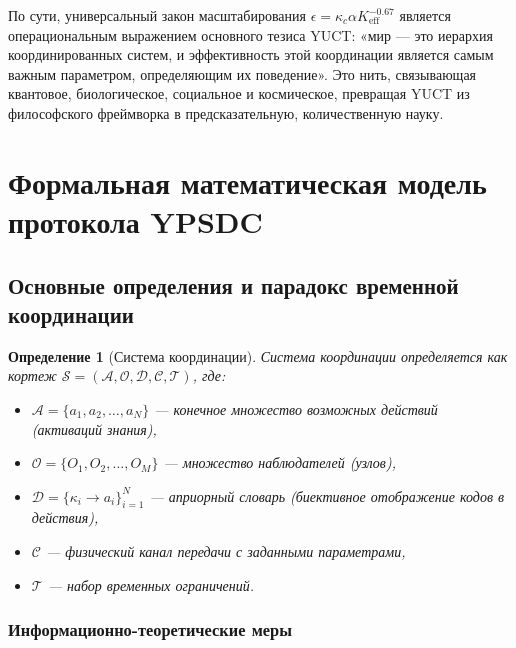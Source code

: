 \documentclass[11pt,a4paper]{article}
\newtheorem{definition}{Определение}
\begin{document}
	По сути, универсальный закон масштабирования \(\epsilon = \kappa_c \alpha K_{\mathrm{eff}}^{-0.67}\) является операциональным выражением основного тезиса YUCT: «мир — это иерархия координированных систем, и эффективность этой координации является самым важным параметром, определяющим их поведение». Это нить, связывающая квантовое, биологическое, социальное и космическое, превращая YUCT из философского фреймворка в предсказательную, количественную науку.
	
	
	\section{Формальная математическая модель протокола YPSDC}
	\label{sec:formal-model}
	
	\subsection{Основные определения и парадокс временной координации}
	
	\begin{definition}[Система координации]
		Система координации определяется как кортеж $\mathcal{S} = (\mathcal{A}, \mathcal{O}, \mathcal{D}, \mathcal{C}, \mathcal{T})$, где:
		\begin{itemize}
			\item $\mathcal{A} = \{a_1, a_2, \dots, a_N\}$ — конечное множество возможных действий (активаций знания),
			\item $\mathcal{O} = \{O_1, O_2, \dots, O_M\}$ — множество наблюдателей (узлов),
			\item $\mathcal{D} = \{\kappa_i \to a_i\}_{i=1}^N$ — априорный словарь (биективное отображение кодов в действия),
			\item $\mathcal{C}$ — физический канал передачи с заданными параметрами,
			\item $\mathcal{T}$ — набор временных ограничений.
		\end{itemize}
	\end{definition}
	
	\subsubsection{Информационно-теоретические меры}
	
\end{document}

